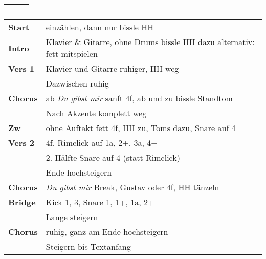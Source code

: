 

\begin{tabular}{p{0.6cm}p{12cm}p{1.4cm}}
	\rowcolor{cyan} \myRow{\thesongnumber} & \myRow{Neues Leben} & \myRow{157} \\
	                                       &                     &             \\
\end{tabular}

\begin{tabular}{p{1.6cm}l}
	\textbf{Start}  & einzählen, dann nur bissle HH                                             \\
	\textbf{Intro}  & Klavier \& Gitarre, ohne Drums bissle HH dazu alternativ: fett mitspielen \\
	\textbf{Vers 1} & Klavier und Gitarre ruhiger, HH weg                                       \\
	                & Dazwischen ruhig                                                          \\
	\textbf{Chorus} & ab \textit{Du gibst mir} sanft 4f, ab und zu bissle Standtom              \\
	                & Nach Akzente komplett weg                                                 \\
	\textbf{Zw}     & ohne Auftakt fett 4f, HH zu, Toms dazu, Snare auf 4                       \\
	\textbf{Vers 2} & 4f, Rimclick auf 1a, 2+, 3a, 4+                                           \\
	                & 2. Hälfte Snare auf 4 (statt Rimclick)                                    \\
	                & Ende hochsteigern                                                         \\
	\textbf{Chorus} & \textit{Du gibst mir} Break, Gustav oder 4f, HH tänzeln                   \\
	\textbf{Bridge} & Kick 1, 3, Snare 1, 1+, 1a, 2+                                            \\
	                & Lange steigern                                                            \\
	\textbf{Chorus} & ruhig, ganz am Ende hochsteigern                                          \\
	                & Steigern bis Textanfang                                                   \\

\end{tabular}
